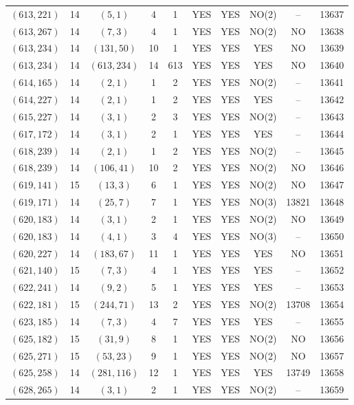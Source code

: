 \begin{longtable}{|c|c|c|c|c|c|c|c|c|c|}
$(613, 221)$ & 14 & $(5, 1)$ & 4 & 1 & YES & YES & NO(2) & -- & 13637\\
$(613, 267)$ & 14 & $(7, 3)$ & 4 & 1 & YES & YES & NO(2) & NO & 13638\\
$(613, 234)$ & 14 & $(131, 50)$ & 10 & 1 & YES & YES & YES & NO & 13639\\
$(613, 234)$ & 14 & $(613, 234)$ & 14 & 613 & YES & YES & YES & NO & 13640\\
$(614, 165)$ & 14 & $(2, 1)$ & 1 & 2 & YES & YES & NO(2) & -- & 13641\\
$(614, 227)$ & 14 & $(2, 1)$ & 1 & 2 & YES & YES & YES & -- & 13642\\
$(615, 227)$ & 14 & $(3, 1)$ & 2 & 3 & YES & YES & NO(2) & -- & 13643\\
$(617, 172)$ & 14 & $(3, 1)$ & 2 & 1 & YES & YES & YES & -- & 13644\\
$(618, 239)$ & 14 & $(2, 1)$ & 1 & 2 & YES & YES & NO(2) & -- & 13645\\
$(618, 239)$ & 14 & $(106, 41)$ & 10 & 2 & YES & YES & NO(2) & NO & 13646\\
$(619, 141)$ & 15 & $(13, 3)$ & 6 & 1 & YES & YES & NO(2) & NO & 13647\\
$(619, 171)$ & 14 & $(25, 7)$ & 7 & 1 & YES & YES & NO(3) & 13821 & 13648\\
$(620, 183)$ & 14 & $(3, 1)$ & 2 & 1 & YES & YES & NO(2) & NO & 13649\\
$(620, 183)$ & 14 & $(4, 1)$ & 3 & 4 & YES & YES & NO(3) & -- & 13650\\
$(620, 227)$ & 14 & $(183, 67)$ & 11 & 1 & YES & YES & YES & NO & 13651\\
$(621, 140)$ & 15 & $(7, 3)$ & 4 & 1 & YES & YES & YES & -- & 13652\\
$(622, 241)$ & 14 & $(9, 2)$ & 5 & 1 & YES & YES & YES & -- & 13653\\
$(622, 181)$ & 15 & $(244, 71)$ & 13 & 2 & YES & YES & NO(2) & 13708 & 13654\\
$(623, 185)$ & 14 & $(7, 3)$ & 4 & 7 & YES & YES & YES & -- & 13655\\
$(625, 182)$ & 15 & $(31, 9)$ & 8 & 1 & YES & YES & NO(2) & NO & 13656\\
$(625, 271)$ & 15 & $(53, 23)$ & 9 & 1 & YES & YES & NO(2) & NO & 13657\\
$(625, 258)$ & 14 & $(281, 116)$ & 12 & 1 & YES & YES & YES & 13749 & 13658\\
$(628, 265)$ & 14 & $(3, 1)$ & 2 & 1 & YES & YES & NO(2) & -- & 13659\\

\end{longtable}
